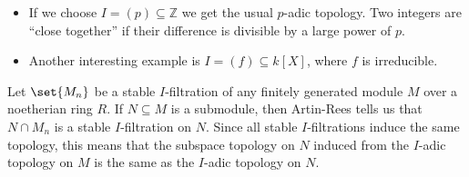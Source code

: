\begin{itemize}
	\item If we choose $I = (p) \subseteq \mathbb{Z}$ we get the usual
		$p$-adic topology. Two integers are \enquote{close together} if their
		difference is divisible by a large power of $p$.
	\item Another interesting example is $I = (f) \subseteq k[X]$, where $f$ is irreducible.
\end{itemize}

Let $\set{M_n}$ be a stable $I$-filtration of any finitely generated module $M$
over a noetherian ring $R$. If $N \subseteq M$ is a submodule, then Artin-Rees tells
us that $N\cap M_n$ is a stable $I$-filtration on $N$. Since all stable $I$-filtrations
induce the same topology, this means that the subspace topology on $N$ induced
from the $I$-adic topology on $M$ is the same as the $I$-adic topology on $N$.
